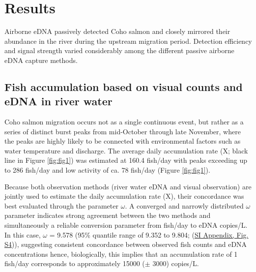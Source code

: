 \documentclass{article}
\begin{document}
\section{Results}

Airborne eDNA passively detected Coho salmon and closely mirrored their abundance  in the river during the upstream migration period. Detection efficiency and signal strength varied considerably among the different passive airborne eDNA capture methods. 

\subsection{Fish accumulation based on visual counts and eDNA in river water}
Coho salmon migration occurs not as a single continuous event, but rather as a series of distinct burst peaks from mid-October through late November, where the peaks are highly likely to be connected with environmental factors such as water temperature and discharge. The average daily accumulation rate (X; black line in Figure \ref{fig:fig1}) was estimated at 160.4 fish/day with peaks exceeding up to 286 fish/day and low activity of ca. 78 fish/day (Figure \ref{fig:fig1}).

Because both observation methods (river water eDNA and visual observation) are jointly used to estimate the daily accumulation rate (X), their concordance was best evaluated through the parameter $\omega$. A converged and narrowly distributed $\omega$ parameter indicates strong agreement between the two methods and simultaneously a reliable conversion parameter from fish/day to eDNA copies/L. In this case, $\omega$ = 9.578 (95\% quantile range of 9.352 to 9.804; (\href{SI_Appendix.pdf}{SI Appendix, Fig. S4})), suggesting consistent concordance between observed fish counts and eDNA concentrations hence, biologically, this implies that an accumulation rate of 1 fish/day corresponds to approximately 15000 ($\pm$ 3000) copies/L.
\end{document}

